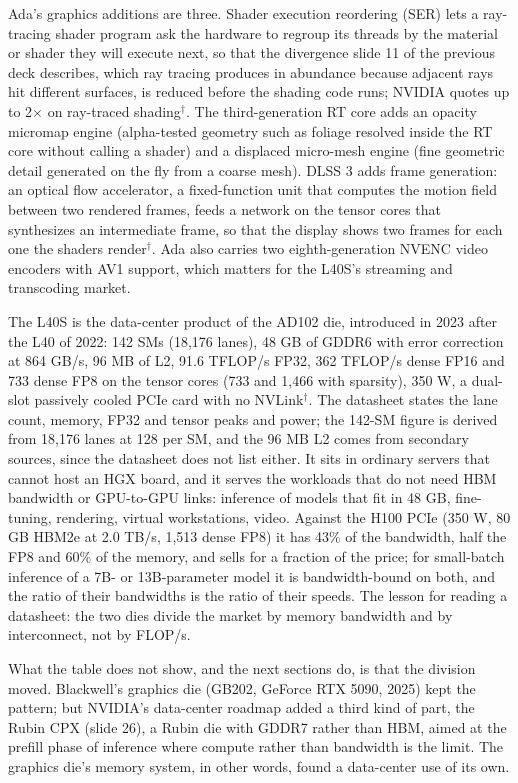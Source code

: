 \documentclass[11pt,letterpaper]{article}
\begin{document}
Ada's graphics additions are three. Shader execution reordering (SER) lets a ray-tracing shader program ask the hardware to regroup its threads by the material or shader they will execute next, so that the divergence slide 11 of the previous deck describes, which ray tracing produces in abundance because adjacent rays hit different surfaces, is reduced before the shading code runs; NVIDIA quotes up to 2$\times$ on ray-traced shading$^\dagger$. The third-generation RT core adds an opacity micromap engine (alpha-tested geometry such as foliage resolved inside the RT core without calling a shader) and a displaced micro-mesh engine (fine geometric detail generated on the fly from a coarse mesh). DLSS 3 adds frame generation: an optical flow accelerator, a fixed-function unit that computes the motion field between two rendered frames, feeds a network on the tensor cores that synthesizes an intermediate frame, so that the display shows two frames for each one the shaders render$^\dagger$. Ada also carries two eighth-generation NVENC video encoders with AV1 support, which matters for the L40S's streaming and transcoding market.

The L40S is the data-center product of the AD102 die, introduced in 2023 after the L40 of 2022: 142 SMs (18{,}176 lanes), 48 GB of GDDR6 with error correction at 864 GB/s, 96 MB of L2, 91.6 TFLOP/s FP32, 362 TFLOP/s dense FP16 and 733 dense FP8 on the tensor cores (733 and 1{,}466 with sparsity), 350 W, a dual-slot passively cooled PCIe card with no NVLink$^\dagger$. The datasheet states the lane count, memory, FP32 and tensor peaks and power; the 142-SM figure is derived from 18{,}176 lanes at 128 per SM, and the 96 MB L2 comes from secondary sources, since the datasheet does not list either. It sits in ordinary servers that cannot host an HGX board, and it serves the workloads that do not need HBM bandwidth or GPU-to-GPU links: inference of models that fit in 48 GB, fine-tuning, rendering, virtual workstations, video. Against the H100 PCIe (350 W, 80 GB HBM2e at 2.0 TB/s, 1{,}513 dense FP8) it has 43\% of the bandwidth, half the FP8 and 60\% of the memory, and sells for a fraction of the price; for small-batch inference of a 7B- or 13B-parameter model it is bandwidth-bound on both, and the ratio of their bandwidths is the ratio of their speeds. The lesson for reading a datasheet: the two dies divide the market by memory bandwidth and by interconnect, not by FLOP/s.

What the table does not show, and the next sections do, is that the division moved. Blackwell's graphics die (GB202, GeForce RTX 5090, 2025) kept the pattern; but NVIDIA's data-center roadmap added a third kind of part, the Rubin CPX (slide 26), a Rubin die with GDDR7 rather than HBM, aimed at the prefill phase of inference where compute rather than bandwidth is the limit. The graphics die's memory system, in other words, found a data-center use of its own.
\end{document}
